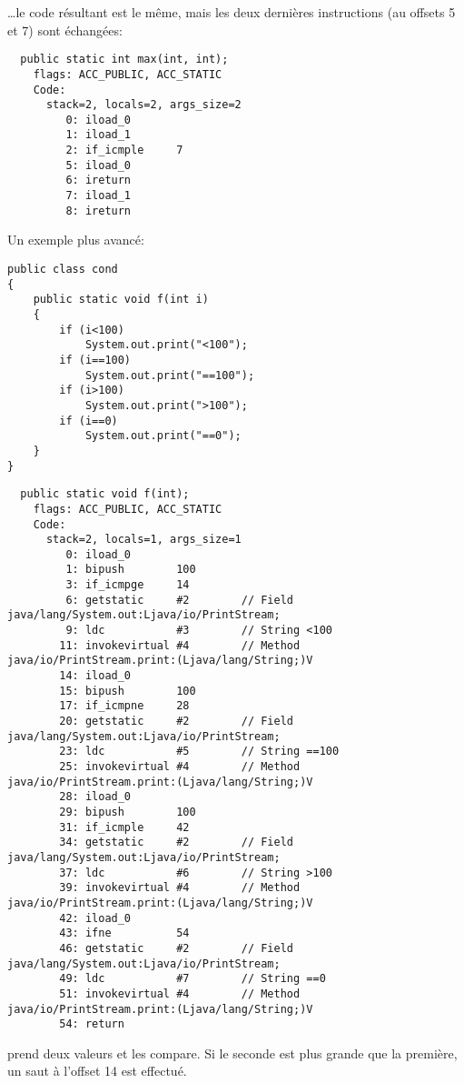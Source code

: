 \dots le code résultant est le même, mais les deux dernières instructions 
(au offsets 5 et 7) sont échangées:

\begin{lstlisting}
  public static int max(int, int);
    flags: ACC_PUBLIC, ACC_STATIC
    Code:
      stack=2, locals=2, args_size=2
         0: iload_0
         1: iload_1
         2: if_icmple     7
         5: iload_0
         6: ireturn
         7: iload_1
         8: ireturn
\end{lstlisting}

Un exemple plus avancé:

\begin{lstlisting}[style=customjava]
public class cond
{
	public static void f(int i)
	{
		if (i<100)
			System.out.print("<100");
		if (i==100)
			System.out.print("==100");
		if (i>100)
			System.out.print(">100");
		if (i==0)
			System.out.print("==0");
	}
}
\end{lstlisting}

\begin{lstlisting}
  public static void f(int);
    flags: ACC_PUBLIC, ACC_STATIC
    Code:
      stack=2, locals=1, args_size=1
         0: iload_0
         1: bipush        100
         3: if_icmpge     14
         6: getstatic     #2        // Field java/lang/System.out:Ljava/io/PrintStream;
         9: ldc           #3        // String <100
        11: invokevirtual #4        // Method java/io/PrintStream.print:(Ljava/lang/String;)V
        14: iload_0
        15: bipush        100
        17: if_icmpne     28
        20: getstatic     #2        // Field java/lang/System.out:Ljava/io/PrintStream;
        23: ldc           #5        // String ==100
        25: invokevirtual #4        // Method java/io/PrintStream.print:(Ljava/lang/String;)V
        28: iload_0
        29: bipush        100
        31: if_icmple     42
        34: getstatic     #2        // Field java/lang/System.out:Ljava/io/PrintStream;
        37: ldc           #6        // String >100
        39: invokevirtual #4        // Method java/io/PrintStream.print:(Ljava/lang/String;)V
        42: iload_0
        43: ifne          54
        46: getstatic     #2        // Field java/lang/System.out:Ljava/io/PrintStream;
        49: ldc           #7        // String ==0
        51: invokevirtual #4        // Method java/io/PrintStream.print:(Ljava/lang/String;)V
        54: return
\end{lstlisting}

 prend deux valeurs et les compare.
Si le seconde est plus grande que la première, un saut à l'offset 14 est effectué.

